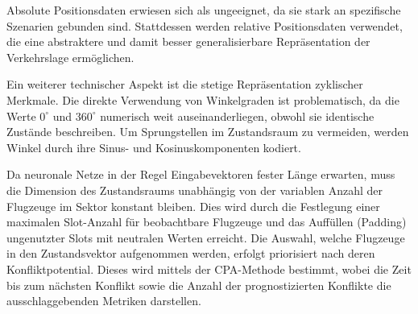 Absolute Positionsdaten erwiesen sich als ungeeignet, da sie stark an spezifische Szenarien gebunden sind. 
Stattdessen werden relative Positionsdaten verwendet, die eine abstraktere und damit besser generalisierbare Repräsentation der Verkehrslage ermöglichen.

Ein weiterer technischer Aspekt ist die stetige Repräsentation zyklischer Merkmale. 
Die direkte Verwendung von Winkelgraden ist problematisch, da die Werte $0^\circ$ und $360^\circ$ numerisch weit auseinanderliegen, obwohl sie identische Zustände beschreiben. 
Um Sprungstellen im Zustandsraum zu vermeiden, werden Winkel durch ihre Sinus\hyp{} und Kosinuskomponenten kodiert.

Da neuronale Netze in der Regel Eingabevektoren fester Länge erwarten, muss die Dimension des Zustandsraums unabhängig von der variablen Anzahl der Flugzeuge im Sektor konstant bleiben. 
Dies wird durch die Festlegung einer maximalen Slot\hyp{}Anzahl für beobachtbare Flugzeuge und das Auffüllen (Padding) ungenutzter Slots mit neutralen Werten erreicht. 
Die Auswahl, welche Flugzeuge in den Zustandsvektor aufgenommen werden, erfolgt priorisiert nach deren Konfliktpotential.
Dieses wird mittels der \ac{CPA}\hyp{}Methode \cite{CPA} bestimmt, wobei die Zeit bis zum nächsten Konflikt sowie die Anzahl der prognostizierten Konflikte die ausschlaggebenden Metriken darstellen.
\medskip

